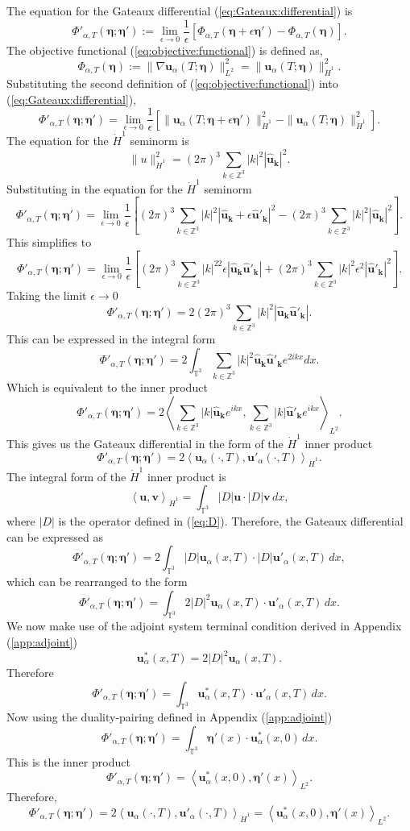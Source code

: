\documentclass[12pt]{article}
\newcommand{\la}{\left\langle}
\newcommand{\ra}{\right\rangle}
\def\hdo{\dot{H}^1}
\def\pat{\Phi_{\alpha,T}}
\def\ppat{\Phi'_{\alpha,T}}
\def\u{\boldsymbol u}
\def\v{\boldsymbol v}
\def\ua{\boldsymbol u_\alpha}
\def\upa{\boldsymbol u'_\alpha}
\def\usa{\boldsymbol u^*_\alpha}
\def\uhk{\hat{\boldsymbol u}_{\boldsymbol k}}
\def\uhpk{\hat{\boldsymbol u}'_{\boldsymbol k}}
\def\be{\boldsymbol \eta}
\def\TT{\mathbb{T}}
\def\ZZ{\mathbb{Z}}
\numberwithin{equation}{section}
\begin{document}
The equation for the Gateaux differential (\ref{eq:Gateaux:differential}) is
$$\ppat(\be;\be'):=\lim_{\epsilon\rightarrow 0}\frac{1}{\epsilon}[\pat(\be+\epsilon\be')-\pat(\be)].$$
The objective functional (\ref{eq:objective:functional}) is defined as,
$$\pat(\be):=\|\nabla \ua(T;\be)\|_{L^2}^2 = \|\ua(T;\be)\|_{\hdo}^2.$$
Substituting the second definition of (\ref{eq:objective:functional}) into (\ref{eq:Gateaux:differential}),
$$\ppat(\be;\be')=\lim_{\epsilon\rightarrow 0}\frac{1}{\epsilon}[\|\ua(T;\be+\epsilon\be')\|_{\hdo}^2-\|\ua(T;\be)\|_{\hdo}^2].$$
The equation for the $\hdo$ seminorm is
$$\|u\|_{\hdo}^2 = (2\pi)^3\sum_{k\in\ZZ^3}|k|^2|\uhk |^2.$$
Substituting in the equation for the $\dot{H}^1$ seminorm
$$\ppat(\be;\be')=\lim_{\epsilon\rightarrow 0}\frac{1}{\epsilon}[(2\pi)^3\sum_{k\in\ZZ^3}|k|^2|\uhk +\epsilon\uhpk |^2-(2\pi)^3\sum_{k\in\ZZ^3}|k|^2|\uhk |^2].$$
This simplifies to
$$\ppat(\be;\be')=\lim_{\epsilon\rightarrow 0}\frac{1}{\epsilon}[(2\pi)^3\sum_{k\in\ZZ^3}|k|^22\epsilon|\uhk\uhpk|+(2\pi)^3\sum_{k\in\ZZ^3}|k|^2\epsilon^2|\uhpk|^2].$$
Taking the limit $\epsilon\rightarrow 0$
$$\ppat(\be;\be')=2(2\pi)^3\sum_{k\in\ZZ^3}|k|^2|\uhk\uhpk|.$$
This can be expressed in the integral form 
$$\ppat(\be;\be')=2\int_{\TT^3}\sum_{k\in\ZZ^3}|k|^2\uhk\uhpk e^{2ikx}dx.$$
Which is equivalent to the inner product
$$\ppat(\be;\be')=2\la\sum_{k\in\ZZ^3}|k|\uhk e^{ikx},\sum_{k\in\ZZ^3}|k|\uhpk e^{ikx}\ra_{L^2}.$$
This gives us the Gateaux differential in the form of the $\hdo$ inner product
$$\ppat(\be;\be')=  2\la\ua(\cdot,T),\upa(\cdot,T)\ra_{\hdo}.$$
The integral form of the $\hdo$ inner product is
$$\la \u, \v \ra_{\hdo} = \int_{\TT^3} |D|\u\cdot |D|\v \, dx,$$
where $|D|$ is the operator defined in (\ref{eq:D}). Therefore, the Gateaux differential can be expressed as
$$\ppat(\be;\be')= 2\int_{\TT^3}|D|\ua(x,T)\cdot|D|\upa(x,T)\,dx,$$
which can be rearranged to the form
$$\ppat(\be;\be')= \int_{\TT^3}2|D|^2\ua(x,T)\cdot\upa(x,T)\,dx.$$
We now make use of the adjoint system terminal condition derived in Appendix (\ref{app:adjoint})
$$\usa(x,T) = 2|D|^2\ua(x,T).$$
Therefore
$$\ppat(\be;\be') = \int_{\TT^3}\usa(x,T)\cdot\upa(x,T)\,dx.$$
Now using the duality-pairing defined in Appendix (\ref{app:adjoint})
$$\ppat(\be;\be') = \int_{\TT^3}\be'(x)\cdot\usa(x,0)\,dx.$$
This is the inner product
$$\ppat(\be;\be') = \la \usa(x,0), \be'(x)\ra_{L^2}.$$
Therefore,
$$\ppat(\be;\be') = 2\la\ua(\cdot,T),\upa(\cdot,T)\ra_{\hdo} = \la \usa(x,0), \be'(x)\ra_{L^2}.$$
\end{document}
